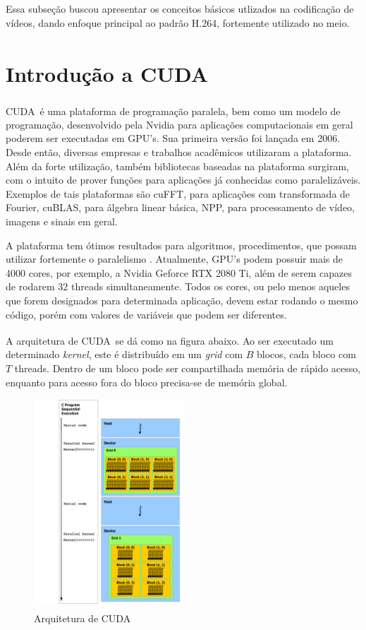 \documentclass[cic,tc]{iiufrgs}
\newcommand{\reg}{\textsuperscript{\textregistered}}
\begin{document}
Essa subseção buscou apresentar os conceitos básicos utlizados na codificação de vídeos, 
dando enfoque principal ao padrão H.264, fortemente utilizado no meio.

\section{Introdução a CUDA\reg}
CUDA\reg~é uma plataforma de programação paralela, bem como um modelo de programação, 
desenvolvido pela Nvidia para aplicações computacionais em geral poderem ser executadas
em GPU's.
Sua primeira versão foi lançada em 2006.
Desde então, diversas empresas e trabalhos acadêmicos utilizaram a plataforma.
Além da forte utilização, também bibliotecas baseadas na plataforma surgiram, 
com o intuito de prover funções para aplicações já conhecidas como paralelizáveis.
Exemplos de tais plataformas são cuFFT, para aplicações com transformada de Fourier,
cuBLAS, para álgebra linear básica, NPP, para processamento de vídeo, imagens e 
sinais em geral.

A plataforma tem ótimos resultados para algoritmos, procedimentos, que possam utilizar
fortemente o paralelismo \cite{CUDAMAIN}.
Atualmente, GPU's podem possuir mais de 4000 cores, por exemplo, a Nvidia Geforce RTX 2080 Ti,
além de serem capazes de rodarem 32 threads simultaneamente.
Todos os cores, ou pelo menos aqueles que forem designados para determinada aplicação,
devem estar rodando o mesmo código, porém com valores de variáveis que podem ser diferentes.

A arquitetura de CUDA\reg~se dá como na figura abaixo.
Ao ser executado um determinado \textit{kernel}, este é distribuído em um \textit{grid}
com $B$ blocos, cada bloco com $T$ threads.
Dentro de um bloco pode ser compartilhada memória de rápido acesso, enquanto para 
acesso fora do bloco precisa-se de memória global.
\begin{figure}[H]
    \caption{Arquitetura de CUDA\reg}
    \begin{center}
        \includegraphics[width=0.5\textwidth]{img/CUDAarch.png}
    \end{center}
\end{figure}
\end{document}
